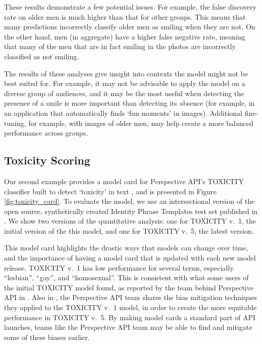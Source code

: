 \documentclass[format=sigconf]{acmart}
\begin{document}
These results demonstrate a few potential issues. 
For example, the false discovery rate on older men is much higher than that for other groups. This means that many predictions incorrectly classify older men as smiling when they are not. On the other hand, men (in aggregate) have a higher false negative rate, meaning that many of the men that are in fact smiling in the photos are incorrectly classified as not smiling. 

The results of these analyses give insight into contexts the model might not be best suited for. For example, it may not be advisable to apply the model on a diverse group of audiences, and it may be the most useful when detecting the presence of a smile is more important than detecting its absence (for example, in an application that automatically finds `fun moments' in images).  Additional fine-tuning, for example, with images of older men, may help create a more balanced performance across groups.

\subsection{Toxicity Scoring} \label{toxicity}

Our second example provides a model card for Perspective API's TOXICITY classifier built to detect `toxicity' in text \cite{perspective_api}, and is presented in Figure \ref{fig:toxicity_card}. To evaluate the model, we use an intersectional version of the open source, synthetically created Identity Phrase Templates test set published in \cite{DixonEtAl2018}. We show two versions of the quantitative analysis: one for TOXICITY v.~1, the initial version of the this model, and one for TOXICITY v.~5, the latest version.



This model card highlights the drastic ways that models can change over time, and the importance of having a model card that is updated with each new model release. TOXICITY v.~1 has low performance for several terms, especially ``lesbian'', ``gay'', and ``homosexual''. This is consistent with what some users of the initial TOXICITY model found, as reported by the team behind Perspective API in \cite{false_positive_blog}. Also in \cite{false_positive_blog}, the Perspective API team shares the bias mitigation techniques they applied to the TOXICITY v.~1 model, in order to create the more equitable performance in TOXICITY v.~5. By making model cards a standard part of API launches, teams like the Perspective API team may be able to find and mitigate some of these biases earlier.
\end{document}
